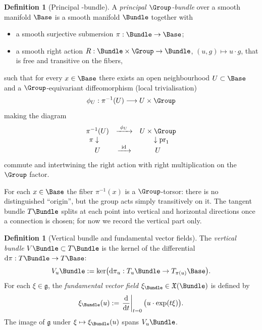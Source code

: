 \documentclass[11pt]{book}
\theoremstyle{plain}
\theoremstyle{definition}
\newtheorem{definition}[theorem]{Definition} \theoremstyle{remark}
\begin{document}
\begin{definition}[Principal \Group-bundle]
A \emph{principal $\Group$-bundle} over a smooth manifold $\Base$ is
  a smooth manifold $\Bundle$ together with
  \begin{itemize}
    \item a smooth surjective submersion
          $\pi:\Bundle\to\Base$;
    \item a smooth right action
          $R:\Bundle\times\Group\to\Bundle$,
          $(u,g)\mapsto u\cdot g$,
          that is free and transitive on the fibers,
  \end{itemize}
  such that for every $x\in\Base$ there exists an open neighbourhood
  $U\subset\Base$ and a $\Group$-equivariant diffeomorphism
  (local trivialisation)
  \[
     \phi_U:\pi^{-1}(U)\longrightarrow U\times\Group
  \]
  making the diagram
  \[
    \begin{array}{ccc}
       \pi^{-1}(U) & \xrightarrow{\ \phi_U\ }
                   & U\times\Group \\
       \pi \downarrow\quad & &
            \quad\downarrow\mathrm{pr}_1 \\
       U & \xrightarrow{\ \mathrm{id}\ }
         & U
    \end{array}
  \]
  commute and intertwining the right action with right multiplication
  on the $\Group$ factor.
\end{definition}

For each $x\in\Base$ the fiber $\pi^{-1}(x)$ is a $\Group$-torsor:
there is no distinguished “origin”, but the group acts simply
transitively on it. The tangent bundle $T\Bundle$ splits at each point
into vertical and horizontal directions once a connection is chosen; for
now we record the vertical part only.



\begin{definition}[Vertical bundle and fundamental vector fields]
The \emph{vertical bundle} $V\Bundle\subset T\Bundle$ is the kernel
  of the differential $\mathrm{d}\pi:T\Bundle\to T\Base$:
  \[
     V_u\Bundle
     :=
     \ker\bigl(\mathrm{d}\pi_u:T_u\Bundle\to T_{\pi(u)}\Base\bigr).
  \]
  For each $\xi\in\mathfrak{g}$, the \emph{fundamental vector field}
  $\xi_\Bundle\in\mathfrak{X}(\Bundle)$ is defined by
  \[
    \xi_\Bundle(u)
    :=
    \left.\frac{\mathrm{d}}{\mathrm{d}t}\right|_{t=0}
    \bigl(u\cdot\exp(t\xi)\bigr).
  \]
  The image of $\mathfrak{g}$ under $\xi\mapsto\xi_\Bundle(u)$ spans
  $V_u\Bundle$.
\end{definition}
\end{document}
